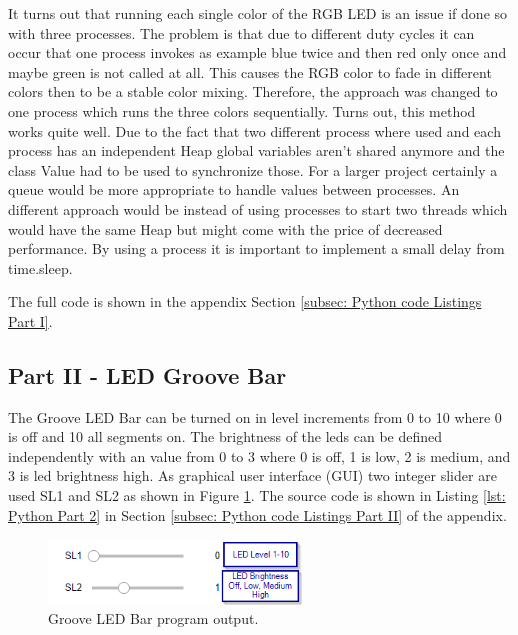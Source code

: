 It turns out that running each single color of the RGB LED is an issue if done so with three processes. The problem is that due to different duty cycles it can occur that one process invokes as example blue twice and then red only once and maybe green is not called at all. This causes the RGB color to fade in different colors then to be a stable color mixing. Therefore, the approach was changed to one process which runs the three colors sequentially. Turns out, this method works quite well.
Due to the fact that two different process where used and each process has an independent Heap global variables aren't shared anymore and the class Value had to be used to synchronize those. For a larger project certainly a queue would be more appropriate to handle values between processes. An different approach would be instead of using processes to start two threads which would have the same Heap but might come with the price of decreased performance. By using a process it is important to implement a small delay from time.sleep. 

The full code is shown in the appendix Section \ref{subsec: Python code Listings Part I}.

\subsection{Part II - LED Groove Bar}\label{subsec: Part II - LED Groove Bar}
The Groove LED Bar can be turned on in level increments from 0 to 10 where 0 is off and 10 all segments on. The brightness of the leds can be defined independently with an value from 0 to 3 where 0 is off, 1 is low, 2 is medium, and 3 is led brightness high. As graphical user interface (GUI) two integer slider are used SL1 and SL2 as shown in Figure \ref{fig: part2_output}. The source code is shown in Listing \ref{lst: Python Part 2} in Section \ref{subsec: Python code Listings Part II} of the appendix.

	\begin{figure}[H]
	\centering
	\includegraphics[width=0.6\textwidth]{01_images/p2_gui}
	\caption{Groove LED Bar program output.}
	\label{fig: part2_output}
	\end{figure}

